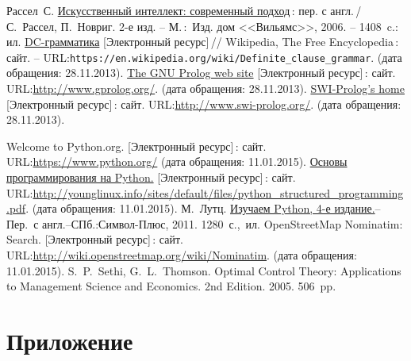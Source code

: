 \documentclass[a4paper,14pt, openany, twoside, draft]{extbook} %
\def\emphbib#1{#1} %
\begin{document}
\begin{thebibliography}{99}
 Рассел~С. \href{http://www.aiportal.ru/downloads/books/ai-modern-approach-2-edition-by-rassel-norvig.html}{Искусственный интеллект: современный подход}\,{}: пер. с англ.\,{}/ С.~Рассел, П.~Новриг. 2-е изд. -- М.\,:~Изд. дом <<Вильямс>>, 2006. -- 1408~c.: ил.
 \emphbib{\href{https://en.wikipedia.org/wiki/Definite_clause_grammar}{DC-грамматика}} [Электронный ресурс]\,{}// Wikipedia, The Free Encyclopedia\,{}: сайт. -- URL:\texttt{https://en.wikipedia.org/wiki/Definite\_clause\linebreak\_grammar}. (дата обращения: 28.11.2013).
 \emphbib{\href{http://www.gprolog.org/}{The GNU Prolog web site} [Электронный ресурс]\,{}: сайт}. URL:\url{http://www.gprolog.org/}. (дата обращения: 28.11.2013).
 \emphbib{\href{http://www.swi-prolog.org/}{SWI-Prolog's home} [Электронный ресурс]\,{}: сайт}. URL:\url{http://www.swi-prolog.org/}. (дата обращения: 28.11.2013).

 Welcome to Python.org.  [Электронный ресурс]\,{}: сайт. URL:\url{https://www.python.org/} (дата обращения: 11.01.2015).
 \href{http://younglinux.info/sites/default/files/python_structured_programming.pdf}{Основы программирования на Python.}  [Электронный ресурс]\,{}: сайт. URL:\url{http://younglinux.info/sites/default/files/python_structured_programming.pdf}. (дата обращения: 11.01.2015).
М.~Лутц.  \href{https://vk.com/doc10903696_196246835?hash=4b80f3cf914c7d65dd&dl=f90686bee18e565271}{Изучаем Python, 4-е издание.}-- Пер.~с англ.--СПб.:Символ-Плюс, 2011. 1280~с.,~ил.
 OpenStreetMap Nominatim: Search.  [Электронный ресурс]\,{}: сайт. URL:\url{http://wiki.openstreetmap.org/wiki/Nominatim}. (дата обращения: 11.01.2015).
S.~P.~Sethi, G.~L.~Thomson. Optimal Control Theory: Applications to Management Science and Economics. 2nd Edition. 2005. 506~pp.
\end{thebibliography}

\chapter*{Приложение}
\label{lastpage}
\end{document}

